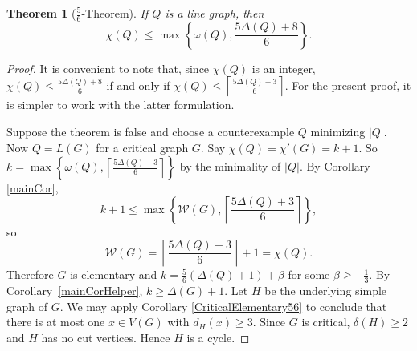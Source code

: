 \documentclass[12pt]{article}
\theoremstyle{plain}
\newtheorem{thm}{Theorem}
\theoremstyle{definition}
\theoremstyle{remark}
\newcommand{\fancy}[1]{\mathcal{#1}}
\newcommand{\W}{\fancy{W}}
\newcommand{\set}[1]{\left\{ #1 \right\}}
\newcommand{\card}[1]{\left|#1\right|}
\newcommand{\ceil}[1]{\left\lceil#1\right\rceil}
\newcommand{\parens}[1]{\left( #1 \right)}
\begin{document}
\begin{thm}[$\frac56$-Theorem]
If $Q$ is a line graph, then
\[\chi(Q)\le \max\set{\omega(Q),\frac{5\Delta(Q)+8}{6}}.\]
\label{thm:main}
\end{thm}
\begin{proof}
It is convenient to note that, since $\chi(Q)$ is an integer,
$\chi(Q)\le \frac{5\Delta(Q)+8}{6}$ if and only if
$\chi(Q)\le \ceil{\frac{5\Delta(Q)+3}{6}}.$  
For the present proof, it is simpler to work with the latter formulation.

Suppose the theorem is false and choose a counterexample $Q$ minimizing $\card{Q}$.  
Now $Q = L(G)$ for a critical graph $G$.  Say $\chi(Q) = \chi'(G) = k + 1$.  So
$k = \max\set{\omega(Q),\ceil{\frac{5\Delta(Q)+3}{6}}}$ by the minimality of
$\card{Q}$.  By Corollary \ref{mainCor},
\[k+1 \le \max\set{\W(G), \ceil{\frac{5\Delta(Q)+3}{6}}},\]
so
\[\W(G) = \ceil{\frac{5\Delta(Q)+3}{6}} + 1 = \chi(Q).\]
Therefore $G$ is elementary and $k = \frac56\parens{\Delta(Q) + 1} + \beta$ for some $\beta \ge -\frac13$.  By Corollary~\ref{mainCorHelper}, $k \ge \Delta(G) + 1$.
Let $H$ be the underlying simple graph of $G$.
We may apply Corollary \ref{CriticalElementary56} to conclude that there is at most one $x \in V(G)$ with $d_H(x) \ge 3$.
Since $G$ is critical, $\delta(H) \ge 2$ and $H$ has no cut vertices. Hence $H$ is a cycle. 


\end{proof}
\end{document}
